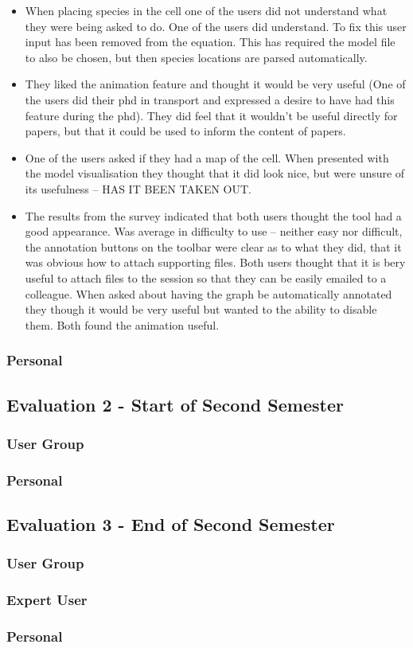 \begin{itemize}
\item When placing species in the cell one of the users did not understand what they were being asked to do.  One of the users did understand.  To fix this user input has been removed from the equation.  This has required the model file to also be chosen, but then species locations are parsed automatically.
\item They liked the animation feature and thought it would be very useful (One of the users did their phd in transport and expressed a desire to have had this feature during the phd).  They did feel that it wouldn't be useful directly for papers, but that it could be used to inform the content of papers.
\item One of the users asked if they had a map of the cell.  When presented with the model visualisation they thought that it did look nice, but were unsure of its usefulness -- HAS IT BEEN TAKEN OUT.
\item The results from the survey indicated that both users thought the tool had a good appearance.  Was average in difficulty to use -- neither easy nor difficult, the annotation buttons on the toolbar were clear as to what they did, that it was obvious how to attach supporting files.  Both users thought that it is bery useful to attach files to the session so that they can be easily emailed to a colleague.  When asked about having the graph be automatically annotated they though it would be very useful but wanted to the ability to disable them.  Both found the animation useful.
\end{itemize}


\subsubsection{Personal}

\subsection{Evaluation 2 - Start of Second Semester}
\subsubsection{User Group}
\subsubsection{Personal}

\subsection{Evaluation 3 - End of Second Semester}
\subsubsection{User Group}
\subsubsection{Expert User}
\subsubsection{Personal}
